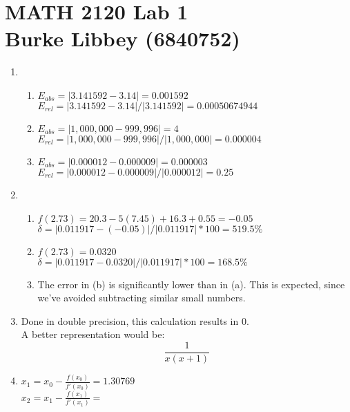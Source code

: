 \documentclass[10pt,letterpaper]{article}
\begin{document}
\section*{\center MATH 2120 Lab 1\\ \small Burke Libbey (6840752)}

\begin{enumerate}

  \item %

    \begin{enumerate}

      \item
        $E_{abs} = |3.141592 - 3.14| = 0.001592$ \\
        $E_{rel} = |3.141592 - 3.14|/|3.141592| = 0.00050674944$
      \item %
        $E_{abs} = |1,000,000 - 999,996| = 4$ \\
        $E_{rel} = |1,000,000 - 999,996|/|1,000,000| = 0.000004$ 
      \item %
        $E_{abs} = |0.000012 - 0.000009| = 0.000003$ \\
        $E_{rel} = |0.000012 - 0.000009|/|0.000012| = 0.25$ 
    \end{enumerate}

  \item %
    \begin{enumerate}
      \item %
        $f(2.73) = 20.3 - 5(7.45) + 16.3 + 0.55 = -0.05$ \\
        $\delta = |0.011917 - (-0.05)|/|0.011917| * 100 = 519.5\%$
      \item %
        $f(2.73) = 0.0320$ \\
        $\delta = |0.011917 - 0.0320|/|0.011917| * 100 = 168.5\%$
      \item The error in (b) is significantly lower than in (a). This is expected, since we've avoided subtracting similar small numbers.
    \end{enumerate}

  \item %
    Done in double precision, this calculation results in $0$. \\
    \noindent A better representation would be:
    \[ \frac{1}{x(x+1)} \]
   
  \item %
      $x_1 = x_0 - \frac{f(x_0)}{f'(x_0)} = 1.30769$ \\
      $x_2 = x_1 - \frac{f(x_1)}{f'(x_1)} =  $
      

\end{enumerate}
\end{document}
